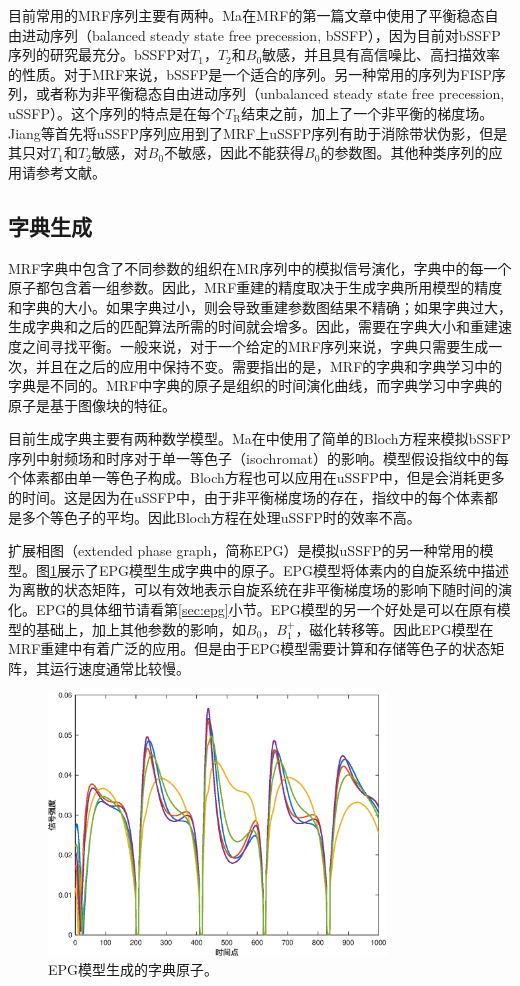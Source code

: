 目前常用的MRF序列主要有两种。Ma\cite{mrf}在MRF的第一篇文章中使用了平衡稳态自由进动序列（balanced steady state free precession, bSSFP\cite{ussfp}），因为目前对bSSFP序列的研究最充分。bSSFP对$T_1$，$T_2$和$B_0$敏感，并且具有高信噪比、高扫描效率的性质。对于MRF来说，bSSFP是一个适合的序列。另一种常用的序列为FISP序列，或者称为非平衡稳态自由进动序列（unbalanced steady state free precession, uSSFP）。这个序列的特点是在每个$T_\mathrm{R}$结束之前，加上了一个非平衡的梯度场。Jiang\cite{jiang}等首先将uSSFP序列应用到了MRF上uSSFP序列有助于消除带状伪影，但是其只对$T_1$和$T_2$敏感，对$B_0$不敏感，因此不能获得$B_0$的参数图。其他种类序列的应用请参考文献\cite{joint,quest}。

\subsection{字典生成}
MRF字典中包含了不同参数的组织在MR序列中的模拟信号演化，字典中的每一个原子都包含着一组参数。因此，MRF重建的精度取决于生成字典所用模型的精度和字典的大小。如果字典过小，则会导致重建参数图结果不精确；如果字典过大，生成字典和之后的匹配算法所需的时间就会增多。因此，需要在字典大小和重建速度之间寻找平衡。一般来说，对于一个给定的MRF序列来说，字典只需要生成一次，并且在之后的应用中保持不变。需要指出的是，MRF的字典和字典学习中的字典是不同的。MRF中字典的原子是组织的时间演化曲线，而字典学习中字典的原子是基于图像块的特征。

目前生成字典主要有两种数学模型。Ma在\cite{mrf}中使用了简单的Bloch方程来模拟bSSFP序列中射频场和时序对于单一等色子（isochromat）的影响。模型假设指纹中的每个体素都由单一等色子构成。Bloch方程也可以应用在uSSFP中，但是会消耗更多的时间。这是因为在uSSFP中，由于非平衡梯度场的存在，指纹中的每个体素都是多个等色子的平均。因此Bloch方程在处理uSSFP时的效率不高。

扩展相图（extended phase graph，简称EPG\cite{weigel}）是模拟uSSFP的另一种常用的模型。图\ref{fig:atoms}展示了EPG模型生成字典中的原子。EPG模型将体素内的自旋系统中描述为离散的状态矩阵，可以有效地表示自旋系统在非平衡梯度场的影响下随时间的演化。EPG的具体细节请看第\ref{sec:epg}小节。EPG模型的另一个好处是可以在原有模型的基础上，加上其他参数的影响，如$B_0$，$B_1^+$，磁化转移等。因此EPG模型在MRF重建中有着广泛的应用。但是由于EPG模型需要计算和存储等色子的状态矩阵，其运行速度通常比较慢。
\begin{figure}[htbp]
\centering
\includegraphics[width=0.8\textwidth]{img/intro/atoms.eps}
\caption{EPG模型生成的字典原子。}
\label{fig:atoms}
\end{figure}


